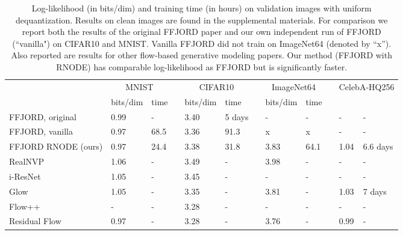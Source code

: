 \documentclass{article}
\theoremstyle{definition}
\theoremstyle{remark}
\begin{document}
\begin{table*}[t]
   \caption{Log-likelihood (in bits/dim) and training time (in hours) on
     validation images with uniform dequantization. Results on clean images are
     found in the supplemental materials. For comparison we report both
 the results of the original FFJORD paper \citep{grathwohl_ffjord} and our own independent run of FFJORD
 (``vanilla") on CIFAR10 and MNIST. Vanilla FFJORD did not train on
 ImageNet64 (denoted by ``x'').  Also reported are results for other flow-based generative
 modeling papers. Our method (FFJORD with RNODE) has comparable log-likelihood
 as FFJORD but is significantly faster.}
   \label{tab:results}
   \vskip 0.15in
   \begin{center}
   \begin{small}
     \begin{sc}
     \begin{adjustbox}{max width=\textwidth}
   \begin{tabular}{lllcllcllcll}
     \toprule
      & \multicolumn{2}{c}{MNIST} & & \multicolumn{2}{c}{CIFAR10} & &
      \multicolumn{2}{c}{ImageNet64} & & \multicolumn{2}{c}{CelebA-HQ256} \\
      & bits/dim &  time & & bits/dim & time & & bits/dim & time \\
  \midrule
     FFJORD, original  & 0.99  &  -   & &
     3.40  &  5 days && - & -&& - & - \\
     FFJORD, vanilla               & 0.97 & 68.5 & & 3.36 & 91.3  && x  &  x
     && - & -\\
FFJORD RNODE (ours)           & 0.97 & 24.4  & & 3.38 & 31.8  && 3.83
     & 64.1 && 1.04 &  6.6 days\\


     \midrule
     RealNVP \scriptsize{\cite{realnvp}}      & 1.06  &  -    & & 3.49  & - &&
     3.98 & -&& - & -\\
     i-ResNet \scriptsize{\cite{iresnet}}& 1.05 &  -    & & 3.45 & -  && - & -
     && - & -\\
     Glow \scriptsize{\cite{glow}}      & 1.05  &   -   & & 3.35  & - && 3.81 &
     - && 1.03 & 7 days\footnotemark\\
     Flow++ \scriptsize{\cite{flow++}}      & - &   -   & & 3.28   &-  &&
     -  & -&& - & - \\
     Residual Flow \scriptsize{\cite{behrmann2018invertible}}& 0.97 &    -  & &
     3.28 & - && 3.76 & - && 0.99 & -\\
        \bottomrule
     \end{tabular}
     \end{adjustbox}
   \end{sc}
     \end{small}
     \end{center}
     \vskip -0.1in
 \end{table*}
\end{document}
